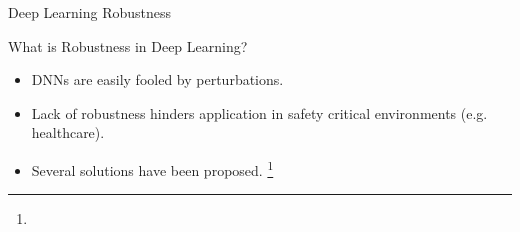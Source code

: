 \begin{frame}{Deep Learning Robustness}
    
    \begin{block}{What is Robustness in Deep Learning?}

        \begin{itemize}
            \item DNNs are easily fooled by perturbations.
            
            \item Lack of robustness hinders application in safety critical environments (e.g. healthcare).
            
            \item Several solutions have been proposed. \footnote[frame]{}
        \end{itemize}
        
    \end{block}

\end{frame}